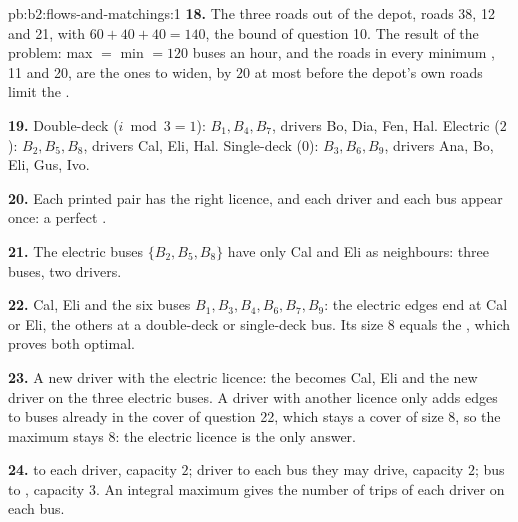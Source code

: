 \begin{solution}{pb:b2:flows-and-matchings:1}
\textbf{18.} The three roads out of the depot, roads 38, 12 and 21, with $60 + 40 + 40 = 140$, the bound of question 10.
The result of the problem: max  $=$ min  $= 120$ buses an hour, and the roads in every minimum , 11 and 20,
are the ones to widen, by $20$ at most before the depot's own roads limit the .

\textbf{19.} Double-deck ($i \bmod 3 = 1$): $B_1, B_4, B_7$, drivers Bo, Dia, Fen, Hal. Electric ($2$): $B_2, B_5, B_8$,
drivers Cal, Eli, Hal. Single-deck ($0$): $B_3, B_6, B_9$, drivers Ana, Bo, Eli, Gus, Ivo.

\textbf{20.} Each printed pair has the right licence, and each driver and each bus appear once: a perfect .

\textbf{21.} The electric buses $\{B_2, B_5, B_8\}$ have only Cal and Eli as neighbours: three buses, two drivers.

\textbf{22.} Cal, Eli and the six buses $B_1, B_3, B_4, B_6, B_7, B_9$: the electric edges end at Cal or Eli, the others
at a double-deck or single-deck bus. Its size $8$ equals the , which proves both optimal.

\textbf{23.} A new driver with the electric licence: the  becomes Cal, Eli and the new driver on the three
electric buses. A driver with another licence only adds edges to buses already in the cover of question 22, which stays
a cover of size 8, so the maximum stays 8: the electric licence is the only answer.

\textbf{24.}  to each driver, capacity $2$; driver to each bus they may drive, capacity $2$; bus to , capacity
$3$. An integral maximum  gives the number of trips of each driver on each bus.
\end{solution}
